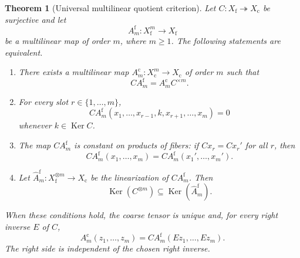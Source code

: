 \documentclass[11pt]{article}
\newtheorem{theorem}{Theorem}[section]
\theoremstyle{definition}
\theoremstyle{remark}
\newcommand{\Ker}{\operatorname{Ker}}
\newcommand{\fine}{\mathrm f}
\newcommand{\coarse}{\mathrm c}
\begin{document}
\begin{theorem}[Universal multilinear quotient criterion]\label{thm:universal-quotient}
Let $C:X_{\fine}\twoheadrightarrow X_{\coarse}$ be surjective and let
\[
  A_m^{\fine}:X_{\fine}^m\to X_{\fine}
\]
be a multilinear map of order $m$, where $m\geq1$.  The following statements are equivalent.

\begin{enumerate}[label=(\roman*),leftmargin=2.8em]
\item There exists a multilinear map $A_m^{\coarse}:X_{\coarse}^m\to X_{\coarse}$ of order $m$ such that
\[
  CA_m^{\fine}=A_m^{\coarse}C^{\times m}.
\]

\item For every slot $r\in\{1,\ldots,m\}$,
\begin{equation}\label{eq:slot-kernel-condition}
  CA_m^{\fine}(x_1,\ldots,x_{r-1},k,x_{r+1},\ldots,x_m)=0
\end{equation}
whenever $k\in\Ker C$.

\item The map $CA_m^{\fine}$ is constant on products of fibers: if $Cx_r=Cx_r'$ for all $r$, then
\begin{equation}\label{eq:fiber-constancy-abstract}
  CA_m^{\fine}(x_1,\ldots,x_m)
  =
  CA_m^{\fine}(x_1',\ldots,x_m').
\end{equation}

\item Let $\widehat A_m^{\fine}:X_{\fine}^{\otimes m}\to X_{\coarse}$ be the linearization of $CA_m^{\fine}$.  Then
\begin{equation}\label{eq:tensor-kernel-condition}
  \Ker(C^{\otimes m})
  \subseteq
  \Ker(\widehat A_m^{\fine}).
\end{equation}
\end{enumerate}

When these conditions hold, the coarse tensor is unique and, for every right inverse $E$ of $C$,
\begin{equation}\label{eq:coarse-via-section}
  A_m^{\coarse}(z_1,\ldots,z_m)
  =
  CA_m^{\fine}(Ez_1,\ldots,Ez_m).
\end{equation}
The right side is independent of the chosen right inverse.
\end{theorem}
\end{document}
